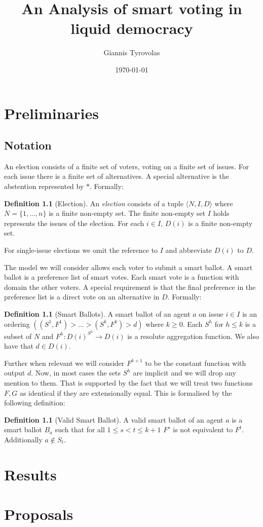\documentclass[11pt,a4paper, titlepage]{report}
\title{An Analysis of smart voting in liquid democracy}
\author{Giannis Tyrovolas}
\date{\today}
\theoremstyle{definition}
\newtheorem{definition}[theorem]{Definition}
\begin{document}
\maketitle

\tableofcontents

\chapter{Preliminaries}

\section{Notation}


An election consists of a finite set of voters, voting on a finite set of issues. For each issue there is a finite set of alternatives. A special alternative is the abstention represented by $*$. Formally:

\begin{definition}[Election]
    An \emph{election} consists of a tuple $\langle N, I, D\rangle $ where $N = \{1,..., n\} $ is a finite non-empty set. The finite non-empty set $I$ holds represents the issues of the election. For each $i \in I$, $D(i)$ is a finite non-empty set.
\end{definition}

For single-issue elections we omit the reference to $I$ and abbreviate $D(i)$ to $D$.

The model we will consider allows each voter to submit a smart ballot. A smart ballot is a preference list of smart votes. Each smart vote is a function with domain the other voters. A special requirement is that the final preference in the preference list is a direct vote on an alternative in $D$. Formally:

\begin{definition}[Smart Ballots]
    A smart ballot of an agent $a$ on issue $i \in I$ is an ordering $( (S^1, F^1) > \ldots > (S^k, F^k) > d)$ where $k \geq 0$. Each $S^h$ for $h \leq k$ is a subset of $N$ and $F^h \colon D(i)^{S^h} \longrightarrow D(i)$ is a resolute aggregation function. We also have that $d \in D(i)$.   
\end{definition}

Further when relevant we will consider $F^{k+1}$ to be the constant function with output $d$. Now, in most cases the sets $S^h$ are implicit and we will drop any mention to them. That is supported by the fact that we will treat two functions $F, G$ as identical if they are extensionally equal. This is formalised by the following definition:

\begin{definition}[Valid Smart Ballot]
    A valid smart ballot of an agent $a$ is a smart ballot $B_a$ such that for all $ 1 \leq s < t \leq k + 1$ $F^s$ is not equivalent to $F^t$. Additionally $a \notin S_t$.
\end{definition}

\chapter{Results}


\chapter{Proposals}
\end{document}
